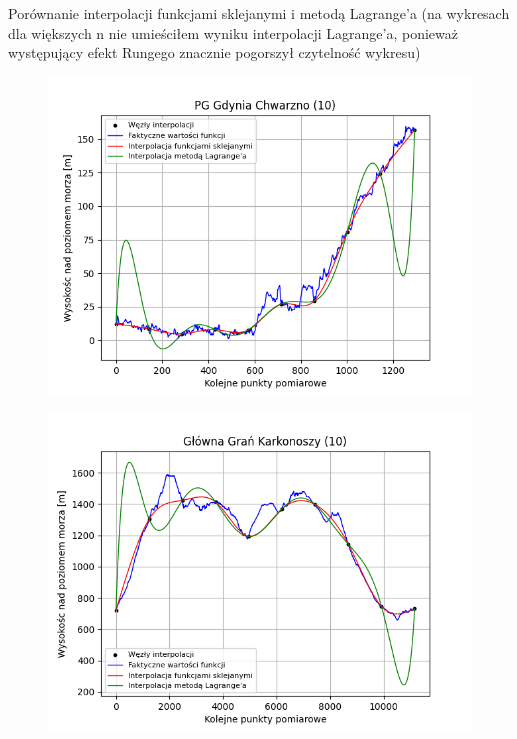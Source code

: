 \documentclass[fleqn]{article}
\begin{document}
    \noindent Porównanie interpolacji funkcjami sklejanymi i metodą Lagrange'a (na wykresach dla większych n nie umieściłem wyniku interpolacji
    Lagrange'a, ponieważ występujący efekt Rungego znacznie pogorszył czytelność wykresu)
    \begin{figure}[h]
        \centering
        \begin{minipage}{.33\textwidth}
            \centering
            \includegraphics[width=\linewidth]{plot_10_points_PG_Gdynia_Chwarzno.png}
            \label{fig:sub1}
        \end{minipage}%
        \begin{minipage}{.33\textwidth}
          \centering
          \includegraphics[width=\linewidth]{plot_10_points_Główna_Grań_Karkonoszy.png}

\end{minipage}
\end{figure}
\end{document}
